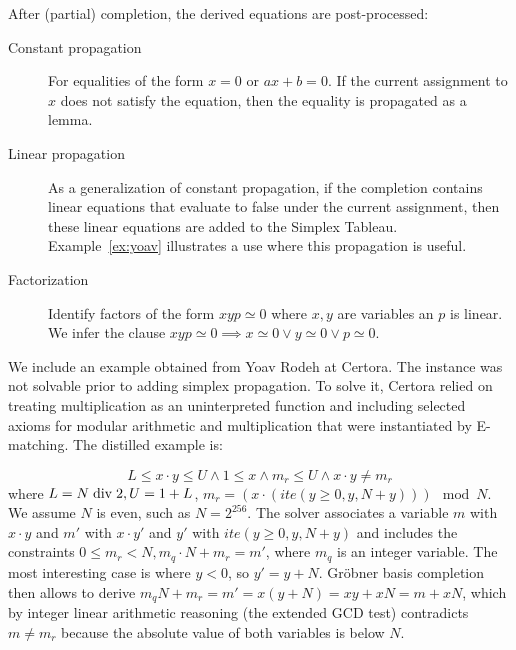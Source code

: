 After (partial) completion, the derived equations are post-processed:
\begin{description}

\item[Constant propagation]
For equalities of the form $x = 0$ or $ax + b = 0$. If the current assignment to $x$ does not
satisfy the equation, then the equality is propagated as a lemma.

\item[Linear propagation]
As a generalization of constant propagation, if the completion contains linear equations that
evaluate to false under the current assignment, then these linear equations are added to the
Simplex Tableau. Example~\ref{ex:yoav} illustrates a use where this propagation is useful.

\item[Factorization] Identify factors of the
form $x y p \simeq 0$ where $x, y$ are variables an $p$ is linear. We infer 
the clause $x y p \simeq 0 \implies x \simeq 0 \lor y \simeq 0 \lor p \simeq 0$.

\end{description}

\begin{example}
\label{ex:yoav}
We include an example obtained from Yoav Rodeh at Certora.
The instance was not solvable prior to adding simplex propagation.
To solve it, Certora relied on treating multiplication as an uninterpreted function and
including selected axioms for modular arithmetic and multiplication that were instantiated by E-matching.
The distilled example is:

\[
   L \leq x \cdot y \leq U \land 1 \leq x \land m_r \leq U \land x \cdot y \neq m_r
\]
where $L = N \;\mathrm{div}\; 2, U = 1 + L$, $m_r = (x \cdot (\mathit{ite}(y \geq 0, y, N + y))) \mod N$.
We assume $N$ is even, such as $N = 2^{256}$.
The solver associates a variable $m$ with $x \cdot y$ and $m'$ with $x \cdot y'$ and $y'$ with $\mathit{ite}(y \geq 0, y, N + y)$
and includes the constraints $0 \leq m_r < N, m_q \cdot N + m_r = m'$, where $m_q$ is an integer variable.
The most interesting case is where $y < 0$, so $y' = y + N$. Gr{\"o}bner basis completion
then allows to derive $m_q N + m_r = m' = x(y + N) = xy + xN = m + xN$, which by integer linear arithmetic reasoning (the extended GCD test)
contradicts $m \neq m_r$ because the absolute value of both variables is below $N$.
\end{example}

